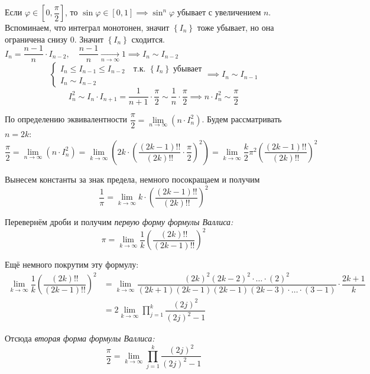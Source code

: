 \documentclass[../main.tex]{subfiles}
\begin{document}
Если \( \varphi \in \left[ 0, \dfrac{ \pi}{ 2}  \right]\), то \( \sin \varphi \in \left[ 0, 1\right] \implies \sin^n \varphi \) убывает с увеличением \( n\). Вспоминаем, что интеграл монотонен, значит \( \left\{ I_n\right\}\) тоже убывает, но она ограничена снизу 0. 
Значит \( \left\{ I_n\right\}\) сходится. \( I_n = \dfrac{ n-1}{ n} \cdot I_{n-2},\quad \dfrac{ n-1}{ n} \underset{n \rightarrow \infty }{\longrightarrow} 1 \implies I_n \sim I_{n-2}\)
\begin{equation*}
    \begin{cases}
        I_n \leq I_{n-1} \leq I_{n-2}\quad \text{т.к. } \left\{ I_n\right\}\;\text{убывает}\\ 
        I_n \sim I_{n-2}
    \end{cases}
    \implies 
    I_n \sim I_{n-1}
\end{equation*}
\[ I_n^2 \sim I_n \cdot I_{n+1}= \dfrac{ 1}{ n+1} \cdot \dfrac{ \pi}{ 2} \sim \dfrac{ 1}{ n} \cdot \dfrac{ \pi}{ 2} \implies n \cdot I_n^2 \sim \dfrac{ \pi}{ 2}   \]

По определению эквивалентности \( \dfrac{ \pi}{ 2} = \lim\limits_{ n\rightarrow \infty } \left( n \cdot I_n^2\right) \). Будем рассматривать \( n=2k\):
\[ \dfrac{ \pi}{ 2} = \lim\limits_{ n\rightarrow \infty } \left( n \cdot I_n^2\right)= \lim\limits_{ k\rightarrow \infty } \left( 2k \cdot \left( \dfrac{ (2k-1)!!}{ (2k)!!} \cdot \dfrac{ \pi}{ 2}  \right)^2\right)= \lim\limits_{ k\rightarrow \infty } \dfrac{ k}{ 2} \pi ^2\left( \dfrac{ (2k-1)!!}{ (2k)!!} \right)^2\]

Вынесем константы за знак предела, немного посокращаем и получим 
\[ \dfrac{ 1}{ \pi } = \lim\limits_{ k\rightarrow \infty } k \cdot \left( \dfrac{ (2k-1)!!}{ (2k)!!} \right)^2\]

Перевернём дроби и получим \emph{первую форму формулы Валлиса:}
\[ \boxed{ \pi = \lim\limits_{ k \rightarrow \infty } \dfrac{ 1}{ k} \left( \dfrac{ (2k)!!}{ (2k-1)!!} \right)^2}\]

Ещё немного покрутим эту формулу: 
\begin{equation*}
    \begin{aligned}
        \lim\limits_{ k \rightarrow \infty } \dfrac{ 1}{ k} \left( \dfrac{ (2k)!!}{ (2k-1)!!} \right)^2&= \lim\limits_{ k\rightarrow \infty } \dfrac{ (2k)^2(2k-2)^2\cdot\ldots\cdot(2)^2}{ (2k+1)(2k-1)(2k-1)(2k-3)\cdot\ldots\cdot(3-1)} \cdot \dfrac{ 2k+1}{ k} \\
        &= 2 \lim\limits_{ k\rightarrow \infty } \displaystyle\prod\limits_{j=1}^k \dfrac{ (2j)^2}{ (2j)^2-1} 
    \end{aligned}
\end{equation*}

Отсюда \emph{вторая форма формулы Валлиса:}
\[ \boxed{ \dfrac{ \pi}{ 2} =\lim\limits_{ k\rightarrow \infty } \displaystyle\prod\limits_{j=1}^k \dfrac{ (2j)^2}{ (2j)^2-1} }\] 
\end{document}

